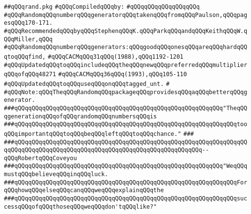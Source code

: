 \label{src/lib/src/rand.pkg}
\verb|##qQQqrand.pkg|\newline
\newline
\verb|#qQQqCompiledqQQqby:|\newline
\verb|#qQQqqQQqqQQqqQQqqQQq|\newline
\newline
\verb|#qQQqRandomqQQqnumberqQQqgeneratorqQQqtakenqQQqfromqQQqPaulson,qQQqpagesqQQq170-171.|\newline
\verb|#qQQqRecommendedqQQqbyqQQqStephenqQQqK.qQQqParkqQQqandqQQqKeithqQQqW.qQQqMiller,qQQq|\newline
\verb|#qQQqRandomqQQqnumberqQQqgenerators:qQQqgoodqQQqonesqQQqareqQQqhardqQQqtoqQQqfind,|\newline
\verb|#qQQqCACMqQQq31qQQq(1988),qQQq1192-1201|\newline
\verb|#qQQqUpdatedqQQqtoqQQqincludeqQQqtheqQQqnewqQQqpreferredqQQqmultiplierqQQqofqQQq48271|\newline
\verb|#qQQqCACMqQQq36qQQq(1993),qQQq105-110|\newline
\verb|#qQQqUpdatedqQQqtoqQQquseqQQqonqQQqtagged_unt.|\newline
\verb|#|\newline
\verb|#qQQqNote:qQQqTheqQQqRandomqQQqpackageqQQqprovidesqQQqaqQQqbetterqQQqgenerator.|\newline
\newline
\newline
\verb|###qQQqqQQqqQQqqQQqqQQqqQQqqQQqqQQqqQQqqQQqqQQqqQQqqQQqqQQqqQQq"TheqQQqgenerationqQQqofqQQqrandomqQQqnumbersqQQqis|\newline
\verb|###qQQqqQQqqQQqqQQqqQQqqQQqqQQqqQQqqQQqqQQqqQQqqQQqqQQqqQQqqQQqqQQqtooqQQqimportantqQQqtoqQQqbeqQQqleftqQQqtoqQQqchance."|\newline
\verb|###|\newline
\verb|###qQQqqQQqqQQqqQQqqQQqqQQqqQQqqQQqqQQqqQQqqQQqqQQqqQQqqQQqqQQqqQQqqQQqqQQqqQQqqQQqqQQqqQQqqQQqqQQqqQQqqQQqqQQqqQQqqQQqqQQqqQQq--qQQqRobertqQQqCoveyou|\newline
\newline
\verb|###qQQqqQQqqQQqqQQqqQQqqQQqqQQqqQQqqQQqqQQqqQQqqQQqqQQqqQQqqQQq"WeqQQqmustqQQqbelieveqQQqinqQQqluck.|\newline
\verb|###qQQqqQQqqQQqqQQqqQQqqQQqqQQqqQQqqQQqqQQqqQQqqQQqqQQqqQQqqQQqqQQqForqQQqhowqQQqelseqQQqcanqQQqweqQQqexplainqQQqthe|\newline
\verb|###qQQqqQQqqQQqqQQqqQQqqQQqqQQqqQQqqQQqqQQqqQQqqQQqqQQqqQQqqQQqqQQqsuccessqQQqofqQQqthoseqQQqweqQQqdon'tqQQqlike?"|\newline
